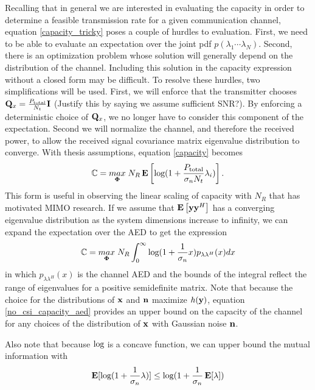 Recalling that in general we are interested in evaluating the capacity in order to determine a feasible transmission rate for a given communication channel, equation \eqref{capacity_tricky} poses a couple of hurdles to evaluation. First, we need to be able to evaluate an expectation over the joint pdf $p(\lambda_1 \cdots	 \lambda_N)$. Second, there is an optimization problem whose solution will generally depend on the distribution of the channel. Including this solution in the capacity expression without a closed form may be difficult.
To resolve these hurdles, two simplifications will be used.
First, we will enforce that the transmitter chooses $\mathbf{Q}_x = \frac{P_{\text{total}}}{N_t}\mathbf{I}$ (Justify this by saying we assume sufficient SNR?). 
By enforcing a deterministic choice of $\mathbf{Q}_x$, we no longer have to consider this component of the expectation.
Second we will normalize the channel, and therefore the received power, to allow the received signal covariance matrix eigenvalue distribution to converge. 
With thesis assumptions, equation \eqref{capacity} becomes
\begin{equation}\label{no_csi_capacity}
\mathbb{C} = \underset{\boldsymbol{\Phi}}{\mathop{max}} \; N_R \mathop{\bf E{}} \left[\text{log{}}(1 + \frac{P_{\text{total}}}{\sigma_nN_t}\lambda_i)\right].
\end{equation}
This form is useful in observing the linear scaling of capacity with $N_R$ that has motivated MIMO research.
If we assume that $\mathop{\bf E{}}\left[ \mathbf{y} \mathbf{y}^H \right]$ has a converging eigenvalue distribution as the system dimensions increase to infinity, we can expand the expectation over the AED to get the expression
\begin{equation}\label{no_csi_capacity_aed}
\mathbb{C} = \underset{\boldsymbol{\Phi}}{\mathop{max}} \; N_R  \int_{0}^{\infty}\text{log{}}(1 + \frac{1}{\sigma_n}x)p_{\lambda\lambda^H}(x) dx
\end{equation}
in which $p_{\lambda\lambda^H}(x)$ is the channel AED and the bounds of the integral reflect the range of eigenvalues for a positive semidefinite matrix.
Note that because the choice for the distributions of $\mathbf{x}$ and $\mathbf{n}$ maximize $h(\mathbf{y})$, equation \eqref{no_csi_capacity_aed} provides an upper bound on the capacity of the channel for any choices of the distribution of $\mathbf{x} $ with Gaussian noise $\mathbf{n}$. 
\par
Also note that because $\text{log{}}$ is a concave function, we can upper bound the mutual information with
\begin{equation}\label{mut_inf}
\mathop{\bf E{}}[\text{log{}}(1 + \frac{1}{\sigma_n}\lambda)] \leq \text{log{}}(1 + \frac{1}{\sigma_n}\mathop{\bf E{}}[\lambda])
\end{equation}